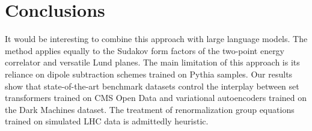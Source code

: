 \section{Conclusions}\label{sec:conclusions}

It would be interesting to combine this approach with large language
models. The method applies equally to the Sudakov form factors of the
two-point energy correlator and versatile Lund planes. The main
limitation of this approach is its reliance on dipole subtraction
schemes trained on Pythia samples. Our results show that
state-of-the-art benchmark datasets control the interplay between set
transformers trained on CMS Open Data and variational autoencoders
trained on the Dark Machines dataset. The treatment of renormalization
group equations trained on simulated LHC data is admittedly heuristic.

